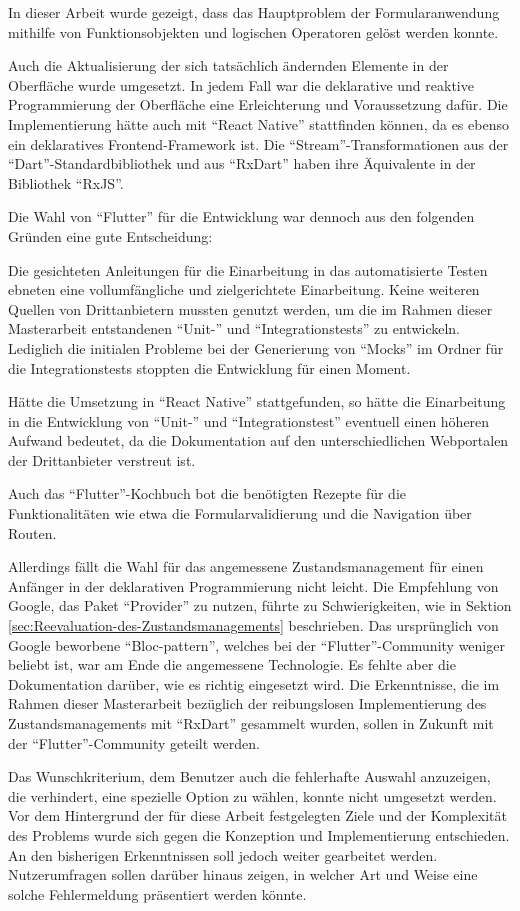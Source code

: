 

In dieser Arbeit wurde gezeigt, dass  das Hauptproblem der Formularanwendung mithilfe von Funktionsobjekten und logischen Operatoren gelöst werden konnte.

Auch die  Aktualisierung der sich tatsächlich ändernden Elemente in der Oberfläche wurde umgesetzt.
In jedem Fall war die deklarative und reaktive Programmierung der Oberfläche eine Erleichterung und Voraussetzung dafür.
Die Implementierung hätte auch mit \enquote{React Native} stattfinden können,
da es ebenso ein deklaratives Frontend-Framework ist.
Die \enquote{Stream}-Transformationen aus der \enquote{Dart}-Standardbibliothek und aus \enquote{RxDart} haben ihre Äquivalente in der Bibliothek \enquote{RxJS}.

Die Wahl von \enquote{Flutter} für die Entwicklung war dennoch aus den folgenden Gründen eine gute Entscheidung:

Die gesichteten Anleitungen für die Einarbeitung in das automatisierte Testen ebneten eine vollumfängliche und zielgerichtete Einarbeitung.
Keine weiteren Quellen von Drittanbietern mussten genutzt werden,
um die im Rahmen dieser Masterarbeit entstandenen \enquote{Unit-} und \enquote{Integrationstests} zu entwickeln.
Lediglich die initialen Probleme bei der Generierung von \enquote{Mocks} im Ordner für die Integrationstests stoppten die Entwicklung für einen Moment.

Hätte die Umsetzung in \enquote{React Native} stattgefunden,
so hätte die Einarbeitung in die Entwicklung von \enquote{Unit-} und \enquote{Integrationstest} eventuell einen höheren Aufwand bedeutet,
da die Dokumentation auf den unterschiedlichen Webportalen der Drittanbieter verstreut ist.

Auch das \enquote{Flutter}-Kochbuch bot die benötigten Rezepte für die Funktionalitäten wie etwa die Formularvalidierung und
die Navigation über Routen.

Allerdings fällt die Wahl für das angemessene Zustandsmanagement für einen Anfänger in der deklarativen Programmierung nicht leicht.
Die Empfehlung von Google, das Paket \enquote{Provider} zu nutzen, führte zu Schwierigkeiten,
wie in Sektion \ref{sec:Reevaluation-des-Zustandsmanagements}
beschrieben.
Das ursprünglich von Google beworbene \enquote{Bloc-pattern},
welches bei der \enquote{Flutter}-Community weniger beliebt ist,
war am Ende die angemessene Technologie.
Es fehlte aber die Dokumentation darüber,
wie es richtig eingesetzt wird.
Die Erkenntnisse,
die im Rahmen dieser Masterarbeit bezüglich der reibungslosen Implementierung des Zustandsmanagements mit \enquote{RxDart} gesammelt wurden,
sollen in Zukunft mit der \enquote{Flutter}-Community geteilt werden.

Das Wunschkriterium,
dem Benutzer auch die fehlerhafte Auswahl anzuzeigen,
die verhindert,
eine spezielle Option zu wählen,
konnte nicht umgesetzt werden.
Vor dem Hintergrund der für diese Arbeit festgelegten Ziele
und der Komplexität des Problems wurde sich gegen die Konzeption und Implementierung entschieden.
An den bisherigen Erkenntnissen soll jedoch weiter gearbeitet werden.
Nutzerumfragen sollen darüber hinaus zeigen,
in welcher Art und Weise eine solche Fehlermeldung präsentiert werden könnte.

 